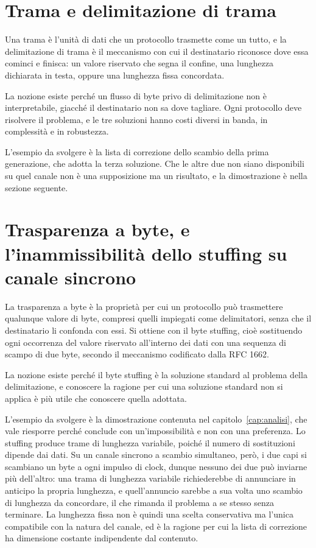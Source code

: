 \section{Trama e delimitazione di trama}

Una trama è l'unità di dati che un protocollo trasmette come un tutto, e la delimitazione di trama è il meccanismo con cui il destinatario riconosce dove essa cominci e finisca: un valore riservato che segna il confine, una lunghezza dichiarata in testa, oppure una lunghezza fissa concordata.

La nozione esiste perché un flusso di byte privo di delimitazione non è interpretabile, giacché il destinatario non sa dove tagliare. Ogni protocollo deve risolvere il problema, e le tre soluzioni hanno costi diversi in banda, in complessità e in robustezza.

L'esempio da svolgere è la lista di correzione dello scambio della prima generazione, che adotta la terza soluzione. Che le altre due non siano disponibili su quel canale non è una supposizione ma un risultato, e la dimostrazione è nella sezione seguente.

\section{Trasparenza a byte, e l'inammissibilità dello stuffing su canale sincrono}

La trasparenza a byte è la proprietà per cui un protocollo può trasmettere qualunque valore di byte, compresi quelli impiegati come delimitatori, senza che il destinatario li confonda con essi. Si ottiene con il byte stuffing, cioè sostituendo ogni occorrenza del valore riservato all'interno dei dati con una sequenza di scampo di due byte, secondo il meccanismo codificato dalla RFC 1662.

La nozione esiste perché il byte stuffing è la soluzione standard al problema della delimitazione, e conoscere la ragione per cui una soluzione standard non si applica è più utile che conoscere quella adottata.

L'esempio da svolgere è la dimostrazione contenuta nel capitolo~\ref{cap:analisi}, che vale riesporre perché conclude con un'impossibilità e non con una preferenza. Lo stuffing produce trame di lunghezza variabile, poiché il numero di sostituzioni dipende dai dati. Su un canale sincrono a scambio simultaneo, però, i due capi si scambiano un byte a ogni impulso di clock, dunque nessuno dei due può inviarne più dell'altro: una trama di lunghezza variabile richiederebbe di annunciare in anticipo la propria lunghezza, e quell'annuncio sarebbe a sua volta uno scambio di lunghezza da concordare, il che rimanda il problema a se stesso senza terminare. La lunghezza fissa non è quindi una scelta conservativa ma l'unica compatibile con la natura del canale, ed è la ragione per cui la lista di correzione ha dimensione costante indipendente dal contenuto.
